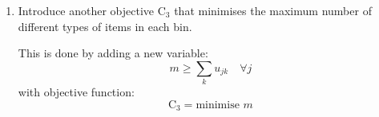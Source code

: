 \documentclass[10pt,a4paper]{article}
\begin{document}
\begin{enumerate}
\item 
Introduce another objective \(\text{C}_3\) that minimises the maximum number of different types of items in each bin.

This is done by adding a new variable:
\begin{equation*}
	m \geq \sum_k u_{jk} \quad \forall j
\end{equation*}
with objective function:
\begin{equation*}
\text{C}_3 = \text{minimise } m
\end{equation*}
\end{enumerate}
\end{document}
